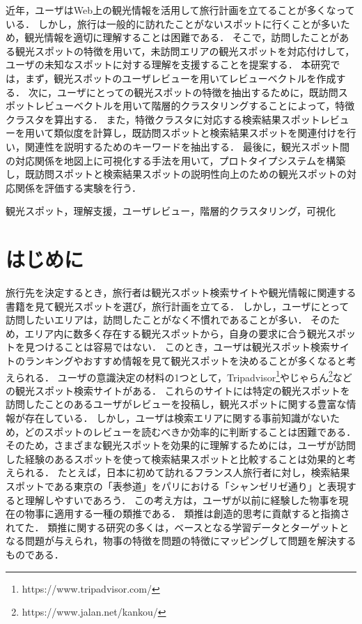 \documentclass{deimj}
\begin{document}
\pagestyle{empty}
\begin{jabstract}
近年，ユーザはWeb上の観光情報を活用して旅行計画を立てることが多くなっている．
しかし，旅行は一般的に訪れたことがないスポットに行くことが多いため，観光情報を適切に理解することは困難である．
そこで，訪問したことがある観光スポットの特徴を用いて，未訪問エリアの観光スポットを対応付けして，ユーザの未知なスポットに対する理解を支援することを提案する．
本研究では，まず，観光スポットのユーザレビューを用いてレビューベクトルを作成する．
次に，ユーザにとっての観光スポットの特徴を抽出するために，既訪問スポットレビューベクトルを用いて階層的クラスタリングすることによって，特徴クラスタを算出する．
また，特徴クラスタに対応する検索結果スポットレビューを用いて類似度を計算し，既訪問スポットと検索結果スポットを関連付けを行い，関連性を説明するためのキーワードを抽出する．
最後に，観光スポット間の対応関係を地図上に可視化する手法を用いて，プロトタイプシステムを構築し，既訪問スポットと検索結果スポットの説明性向上のための観光スポットの対応関係を評価する実験を行う．

\end{jabstract}

\begin{jkeyword}
観光スポット，理解支援，ユーザレビュー，階層的クラスタリング，可視化
\end{jkeyword}
\maketitle

\section{はじめに}
\label{sec:はじめに}
旅行先を決定するとき，旅行者は観光スポット検索サイトや観光情報に関連する書籍を見て観光スポットを選び，旅行計画を立てる．
しかし，ユーザにとって訪問したいエリアは，訪問したことがなく不慣れであることが多い．
そのため，エリア内に数多く存在する観光スポットから，自身の要求に合う観光スポットを見つけることは容易ではない．
このとき，ユーザは観光スポット検索サイトのランキングやおすすめ情報を見て観光スポットを決めることが多くなると考えられる．
ユーザの意識決定の材料の1つとして，Tripadvisor\footnote{https://www.tripadvisor.com/}やじゃらん\footnote{https://www.jalan.net/kankou/}などの観光スポット検索サイトがある．
これらのサイトには特定の観光スポットを訪問したことのあるユーザがレビューを投稿し，観光スポットに関する豊富な情報が存在している．
しかし，ユーザは検索エリアに関する事前知識がないため，どのスポットのレビューを読むべきか効率的に判断することは困難である．
そのため，さまざまな観光スポットを効果的に理解するためには，ユーザが訪問した経験のあるスポットを使って検索結果スポットと比較することは効果的と考えられる．
たとえば，日本に初めて訪れるフランス人旅行者に対し，検索結果スポットである東京の「表参道」をパリにおける「シャンゼリゼ通り」と表現すると理解しやすいであろう．
この考え方は，ユーザが以前に経験した物事を現在の物事に適用する一種の類推である\cite{Gentner}．
類推は創造的思考に貢献すると指摘されてた\cite{Holyoak}．
類推に関する研究の多くは，ベースとなる学習データとターゲットとなる問題が与えられ，物事の特徴を問題の特徴にマッピングして問題を解決するもの\cite{Gick}である．
\end{document}
